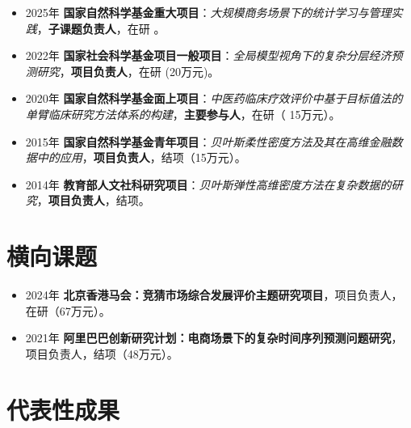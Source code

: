 \documentclass[twoside,a4paper,11pt]{article}
\begin{document}
\begin{itemize}

\item 2025年 \textbf{国家自然科学基金重大项目}：\emph{大规模商务场景下的统计学习与管理实践}，\textbf{子课题负责人}，在研 。

\item 2022年 \textbf{国家社会科学基金项目一般项目}：\emph{全局模型视角下的复杂分层经济预测研究}，\textbf{项目负责人}，在研 (20万元)。

\item 2020年 \textbf{国家自然科学基金面上项目}：\emph{中医药临床疗效评价中基于目标值法的单臂临床研究方法体系的构建}，\textbf{主要参与人}，在研（ 15万元）。

\item 2015年 \textbf{国家自然科学基金青年项目}：\emph{贝叶斯柔性密度方法及其在高维金融数据中的应用}，\textbf{项目负责人}，结项（15万元）。

\item 2014年 \textbf{教育部人文社科研究项目}：\emph{贝叶斯弹性高维密度方法在复杂数据的研究}，\textbf{项目负责人}，结项。

\end{itemize}

\section{横向课题}
\begin{itemize}

\item 2024年 \textbf{北京香港马会：竞猜市场综合发展评价主题研究项目}，项目负责人，在研（67万元）。

\item 2021年 \textbf{阿里巴巴创新研究计划：电商场景下的复杂时间序列预测问题研究}，项目负责人，结项（48万元）。

\end{itemize}

\section{代表性成果}
\begin{refsection}
\nocite{HuangY2024LocalInformation}
\nocite{ZhangB2023OptimalReconciliation}
\nocite{KangY2022ForecastForecasts}
\nocite{ZhuX2021LeastSquareApproximation}
\nocite{LiF2018ImprovingForecasting}
\printbibliography[heading=none]
\end{refsection}
\end{document}
